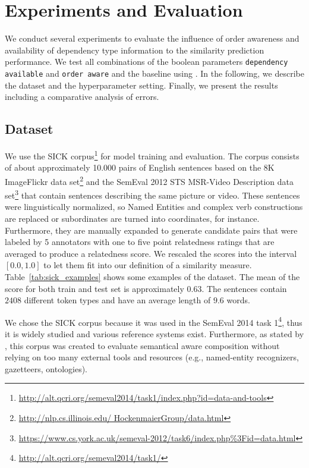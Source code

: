 \section{Experiments and Evaluation}
We conduct several experiments to evaluate the influence of order awareness and availability of dependency type information to the similarity prediction performance. We test all combinations of the boolean parameters \texttt{dependency available} and \texttt{order aware} and the baseline using . In the following, we describe the dataset and the hyperparameter setting. Finally, we present the results including a comparative analysis of errors.

\subsection{Dataset}
We use the SICK corpus\footnote{\url{http://alt.qcri.org/semeval2014/task1/index.php?id=data-and-tools}} \autocite{marelli_sick_2014} for model training and evaluation. The corpus consists of about approximately 10.000 pairs of English sentences based on the 8K ImageFlickr data set\footnote{\url{http://nlp.cs.illinois.edu/
HockenmaierGroup/data.html}} \autocite{hodosh_framing_2013} and the SemEval 2012 STS MSR-Video Description data set\footnote{\url{https://www.cs.york.ac.uk/semeval-2012/task6/index.php\%3Fid=data.html}} \autocite{agirre_semeval-2012_2012} that contain sentences describing the same picture or video. These sentences were linguistically normalized, so Named Entities and complex verb constructions are replaced or subordinates are turned into coordinates, for instance. Furthermore, they are manually expanded to generate candidate pairs that were labeled by 5 annotators with one to five point relatedness ratings that are averaged to produce a relatedness score. We rescaled the scores into the interval $[0.0, 1.0]$ to let them fit into our definition of a similarity measure. Table~\ref{tab:sick_examples} shows some examples of the dataset. The mean of the score for both train and test set is approximately $0.63$. The sentences contain $2408$ different token types and have an average length of $9.6$ words.  

We chose the SICK corpus because it was used in the SemEval 2014 task 1\footnote{\url{http://alt.qcri.org/semeval2014/task1/}}, thus it is widely studied and various reference systems exist. Furthermore, as stated by \textcite{marelli_semeval-2014_2014}, this corpus was created to evaluate semantical aware composition without relying on too many external tools and resources (e.g., named-entity recognizers, gazetteers, ontologies).

